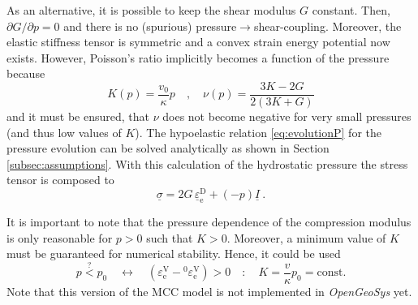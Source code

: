 \documentclass[paper=a4, twoside, pagesize]{scrartcl}
\newcommand{\tensor}[1]{\underline{#1}}
\newcommand{\D}{\text{D}}
\newcommand{\e}{\text{e}}
\newcommand{\minus}{-}
\begin{document}
\par
As an alternative, it is possible to keep the shear modulus $G$ constant. Then, ${\partial G}/{\partial p}=0$ and there is no (spurious) pressure$\rightarrow$shear-coupling. Moreover, the elastic stiffness tensor is symmetric and a convex strain energy potential now exists. However, Poisson's ratio implicitly becomes a function of the pressure because
\begin{equation}
  K(p) = \frac{v_0}{\kappa}p \quad,\quad \nu(p)=\frac{3K-2G}{2(3K+G)}
\end{equation}
and it must be ensured, that $\nu$ does not become negative for very small pressures (and thus low values of $K$). The hypoelastic relation \eqref{eq:evolutionP} for the pressure evolution can be solved analytically as shown in Section \ref{subsec:assumptions}. With this calculation of the hydrostatic pressure the stress tensor is composed to
\begin{equation}
  \tensor\sigma = 2G\,\tensor\varepsilon_\e^\D + (\minus p) \tensor I \ .    
\end{equation}
\par
It is important to note that the pressure dependence of the compression modulus is only reasonable for $p>0$ such that $K>0$. Moreover, a minimum value of $K$ must be guaranteed for numerical stability. Hence, it could be used
\begin{equation}
    p \overset{?}{<} p_0 \quad\leftrightarrow\quad \left(\varepsilon_\e^\text{V}-{}^0\varepsilon_\e^\text{V}\right)>0 \quad : \quad K = \frac{v}{\kappa}p_0 = \text{const.}
\end{equation}
Note that this version of the MCC model is not implemented in \textsl{OpenGeoSys} yet.


\printbibliography
\end{document}
